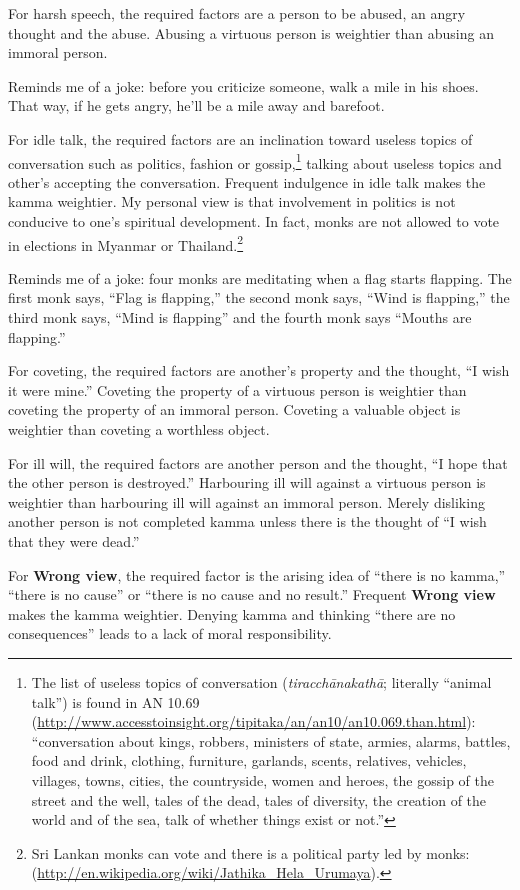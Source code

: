 For harsh speech, the required factors are a person to be abused, an angry thought and the abuse. Abusing a virtuous person is weightier than abusing an immoral person. 

Reminds me of a joke: before you criticize someone, walk a mile in his shoes. That way, if he gets angry, he’ll be a mile away and barefoot.

For idle talk, the required factors are an inclination toward useless topics of conversation such as politics, fashion or gossip,\footnote{The list of useless topics of conversation (\textit{tiracchānakathā}; literally “animal talk”) is found in AN 10.69 (\url{http://www.accesstoinsight.org/tipitaka/an/an10/an10.069.than.html}): “conversation about kings, robbers, ministers of state, armies, alarms, battles, food and drink, clothing, furniture, garlands, scents, relatives, vehicles, villages, towns, cities, the countryside, women and heroes, the gossip of the street and the well, tales of the dead, tales of diversity, the creation of the world and of the sea, talk of whether things exist or not.”} talking about useless topics and other’s accepting the conversation. Frequent indulgence in idle talk makes the kamma weightier. My personal view is that involvement in politics is not conducive to one’s spiritual development. In fact, monks are not allowed to vote in elections in Myanmar or Thailand.\footnote{Sri Lankan monks can vote and there is a political party led by monks: (\url{http://en.wikipedia.org/wiki/Jathika_Hela_Urumaya}).} 

Reminds me of a joke: four monks are meditating when a flag starts flapping. The first monk says, “Flag is flapping,” the second monk says, “Wind is flapping,” the third monk says, “Mind is flapping” and the fourth monk says “Mouths are flapping.”

For coveting, the required factors are another’s property and the thought, “I wish it were mine.” Coveting the property of a virtuous person is weightier than coveting the property of an immoral person. Coveting a valuable object is weightier than coveting a worthless object.

For ill will, the required factors are another person and the thought, “I hope that the other person is destroyed.” Harbouring ill will against a virtuous person is weightier than harbouring ill will against an immoral person. Merely disliking another person is not completed kamma unless there is the thought of “I wish that they were dead.”

For \textbf{Wrong view}, the required factor is the arising idea of “there is no kamma,” “there is no cause” or “there is no cause and no result.” Frequent \textbf{Wrong view} makes the kamma weightier. Denying kamma and thinking “there are no consequences” leads to a lack of moral responsibility.

